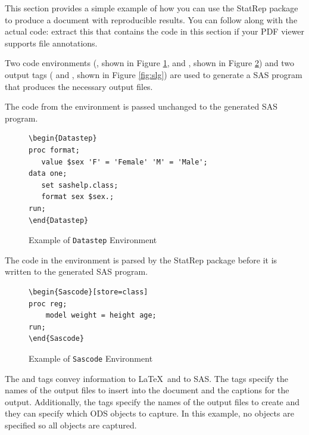 \documentclass[article,oneside]{memoir}
\newcommand*{\StatRep}{\textsf{StatRep}\xspace}
\begin{document}
This section provides a simple example of how you can use the \StatRep package
to produce a document with reproducible results.
You can follow along with the actual code: extract this
 that
contains the code in this section if your PDF viewer supports file annotations.

  Two code environments
  (, shown in Figure \ref{fig:d1}, and
  , shown in Figure \ref{fig:s1})
  and two output tags
  ( and , shown in Figure \ref{fig:slg})
  are used to generate a SAS program that produces
  the necessary output files.

  The code from the  environment is passed unchanged to the
  generated SAS program.
\begin{figure}[H]
\begin{snugshade}
\begin{verbatim}
\begin{Datastep}
proc format;
   value $sex 'F' = 'Female' 'M' = 'Male';
data one;
   set sashelp.class;
   format sex $sex.;
run;
\end{Datastep}
\end{verbatim}
\end{snugshade}
\caption{Example of \texttt{Datastep} Environment}\label{fig:d1}
\end{figure}

  The code in the  environment is parsed by the \StatRep package before it is
  written to the generated SAS program.

\begin{figure}[H]
\begin{snugshade}
\begin{verbatim}
\begin{Sascode}[store=class]
proc reg;
    model weight = height age;
run;
\end{Sascode}
\end{verbatim}
\end{snugshade}
\caption{Example of \texttt{Sascode} Environment}\label{fig:s1}
\end{figure}

  The  and  tags convey information to \LaTeX\ and to SAS.
  The tags specify the names of the output files to insert into the document
  and the captions for the output.
  Additionally, the tags specify the names of the output files to
  create and they can specify which
  ODS objects to capture. In this example, no objects are specified so all
  objects are captured.
\end{document}
